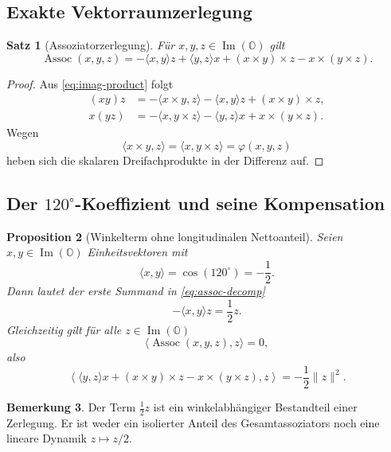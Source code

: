 \documentclass[11pt,a4paper]{article}
\newtheorem{theorem}{Satz}[section]
\newtheorem{proposition}[theorem]{Proposition}
\theoremstyle{definition}
\newtheorem{remark}[theorem]{Bemerkung}
\newcommand{\ImO}{\operatorname{Im}(\mathbb O)}
\newcommand{\Assoc}{\operatorname{Assoc}}
\begin{document}
\subsection{Exakte Vektorraumzerlegung}

\begin{theorem}[Assoziatorzerlegung]
\label{thm:assoc-decomp}
Für $x,y,z\in\ImO$ gilt
\begin{equation}
\Assoc(x,y,z)
=
-\langle x,y\rangle z
+\langle y,z\rangle x
+(x\times y)\times z
-x\times(y\times z).
\label{eq:assoc-decomp}
\end{equation}
\end{theorem}

\begin{proof}
Aus \cref{eq:imag-product} folgt
\begin{align}
(xy)z
&=
-\langle x\times y,z\rangle
-\langle x,y\rangle z
+(x\times y)\times z,\\
x(yz)
&=
-\langle x,y\times z\rangle
-\langle y,z\rangle x
+x\times(y\times z).
\end{align}
Wegen
\[
\langle x\times y,z\rangle
=
\langle x,y\times z\rangle
=
\varphi(x,y,z)
\]
heben sich die skalaren Dreifachprodukte in der Differenz auf.
\end{proof}

\subsection{Der $120^\circ$-Koeffizient und seine Kompensation}

\begin{proposition}[Winkelterm ohne longitudinalen Nettoanteil]
\label{prop:120}
Seien $x,y\in\ImO$ Einheitsvektoren mit
\[
\langle x,y\rangle=\cos(120^\circ)=-\frac12.
\]
Dann lautet der erste Summand in \cref{eq:assoc-decomp}
\[
-\langle x,y\rangle z=\frac12z.
\]
Gleichzeitig gilt für alle $z\in\ImO$
\[
\langle\Assoc(x,y,z),z\rangle=0,
\]
also
\begin{equation}
\left\langle
\langle y,z\rangle x
+(x\times y)\times z
-x\times(y\times z),
z
\right\rangle
=
-\frac12\|z\|^2.
\label{eq:compensation}
\end{equation}
\end{proposition}

\begin{remark}
Der Term $\tfrac12z$ ist ein winkelabhängiger Bestandteil einer Zerlegung. Er ist weder ein isolierter Anteil des Gesamtassoziators noch eine lineare Dynamik $z\mapsto z/2$.
\end{remark}
\end{document}
